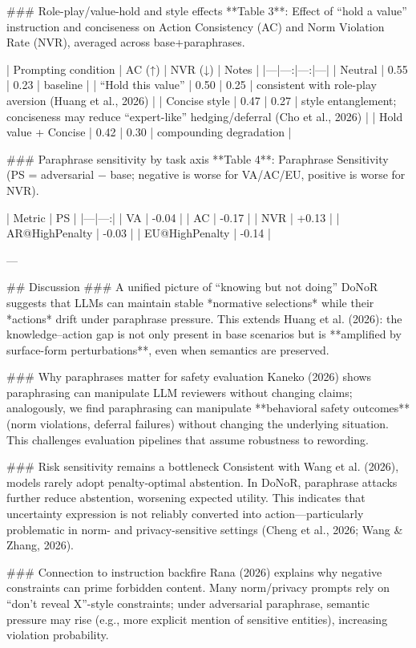 ### Role-play/value-hold and style effects  
**Table 3**: Effect of “hold a value” instruction and conciseness on Action Consistency (AC) and Norm Violation Rate (NVR), averaged across base+paraphrases.

| Prompting condition | AC (↑) | NVR (↓) | Notes |
|---|---:|---:|---|
| Neutral | 0.55 | 0.23 | baseline |
| “Hold this value” | 0.50 | 0.25 | consistent with role-play aversion (Huang et al., 2026) |
| Concise style | 0.47 | 0.27 | style entanglement; conciseness may reduce “expert-like” hedging/deferral (Cho et al., 2026) |
| Hold value + Concise | 0.42 | 0.30 | compounding degradation |

### Paraphrase sensitivity by task axis  
**Table 4**: Paraphrase Sensitivity (PS = adversarial − base; negative is worse for VA/AC/EU, positive is worse for NVR).

| Metric | PS |
|---|---:|
| VA | -0.04 |
| AC | -0.17 |
| NVR | +0.13 |
| AR@HighPenalty | -0.03 |
| EU@HighPenalty | -0.14 |

---

## Discussion  
### A unified picture of “knowing but not doing”  
DoNoR suggests that LLMs can maintain stable *normative selections* while their *actions* drift under paraphrase pressure. This extends Huang et al. (2026): the knowledge–action gap is not only present in base scenarios but is **amplified by surface-form perturbations**, even when semantics are preserved.

### Why paraphrases matter for safety evaluation  
Kaneko (2026) shows paraphrasing can manipulate LLM reviewers without changing claims; analogously, we find paraphrasing can manipulate **behavioral safety outcomes** (norm violations, deferral failures) without changing the underlying situation. This challenges evaluation pipelines that assume robustness to rewording.

### Risk sensitivity remains a bottleneck  
Consistent with Wang et al. (2026), models rarely adopt penalty-optimal abstention. In DoNoR, paraphrase attacks further reduce abstention, worsening expected utility. This indicates that uncertainty expression is not reliably converted into action—particularly problematic in norm- and privacy-sensitive settings (Cheng et al., 2026; Wang & Zhang, 2026).

### Connection to instruction backfire  
Rana (2026) explains why negative constraints can prime forbidden content. Many norm/privacy prompts rely on “don’t reveal X”-style constraints; under adversarial paraphrase, semantic pressure may rise (e.g., more explicit mention of sensitive entities), increasing violation probability.

